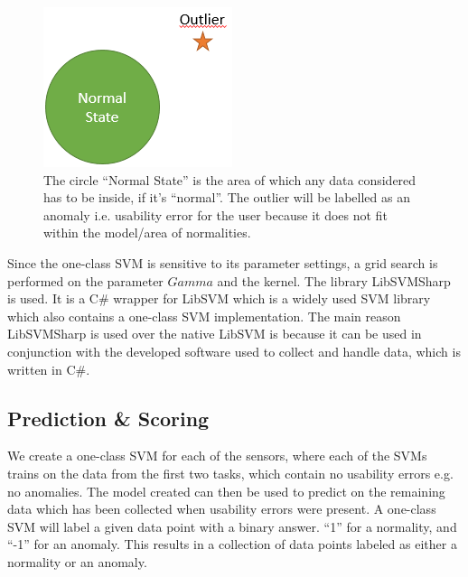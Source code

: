 \begin{figure}[H]
    \centering
  \includegraphics[width=0.75\columnwidth]{graphics/oneclass-svm.png}
    \caption{The circle ``Normal State'' is the area of which any data considered has to be inside, if it's ``normal''. The outlier will be labelled as an anomaly i.e. usability error for the user because it does not fit within the model/area of normalities. }
    \label{[FIGURE] OneClass SVM}
\end{figure}

Since the one-class SVM is sensitive\cite{oneClassSVM} to its parameter settings, a grid search is performed on the parameter $Gamma$ and the kernel.
The library LibSVMSharp\cite{libsvmsharp} is used. It is a C\# wrapper for LibSVM\cite{libsvm} which is a widely used SVM library which also contains a one-class SVM implementation. The main reason LibSVMSharp is used over the native LibSVM is because it can be used in conjunction with the developed software used to collect and handle data, which is written in C\#.

\subsection{Prediction \& Scoring}
We create a one-class SVM for each of the sensors, where each of the SVMs trains on the data from the first two tasks, which contain no usability errors e.g. no anomalies. The model created can then be used to predict on the remaining data which has been collected when usability errors were present.
A one-class SVM will label a given data point with a binary answer. ``1'' for a normality, and ``-1'' for an anomaly.
This results in a collection of data points labeled as either a normality or an anomaly.

